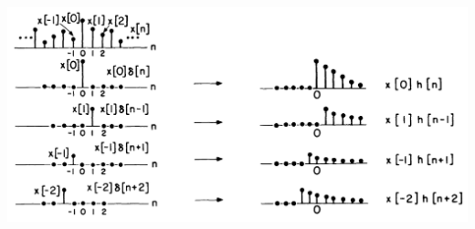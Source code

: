 \documentclass[pdflatex,compress,mathserif]{beamer}
\begin{document}
\begin{frame}
	\begin{center}
		\includegraphics[width=\linewidth]{img/img02}
	\end{center}
\end{frame}
\end{document}
